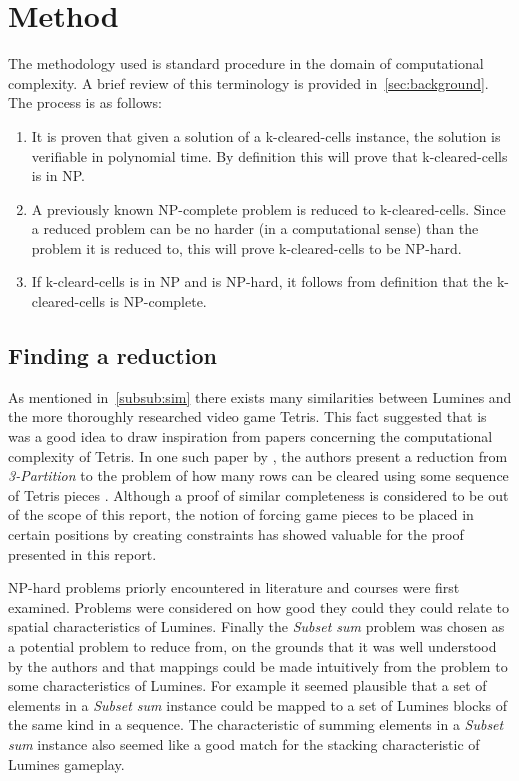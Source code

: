 \section{Method}
\label{method}

The methodology used is standard procedure in the domain of computational complexity. A brief review of this terminology is provided in~\ref{sec:background}.
The process is as follows:

\begin{enumerate}
\item It is proven that given a solution of a k-cleared-cells instance, the solution is verifiable in polynomial time. By definition this will prove that k-cleared-cells is in NP.
\item A previously known NP-complete problem is reduced to k-cleared-cells. Since a reduced problem can be no harder (in a computational sense) than the problem it is reduced to, this will prove k-cleared-cells to be NP-hard.
\item If k-cleard-cells is in NP and is NP-hard, it follows from definition that the k-cleared-cells is NP-complete.
\end{enumerate}

\subsection{Finding a reduction}
As mentioned in~\ref{subsub:sim} there exists many similarities between Lumines and the more thoroughly researched video game Tetris. This fact suggested that is was a good idea to draw inspiration from papers concerning the computational complexity of Tetris. In one such paper by \citeauthor{tetris}, the authors present a reduction from \textit{3-Partition} to the problem of how many rows can be cleared using some sequence of Tetris pieces \cite{tetris}. Although a proof of similar completeness is considered to be out of the scope of this report, the notion of forcing game pieces to be placed in certain positions by creating constraints has showed valuable for the proof presented in this report.

NP-hard problems priorly encountered in literature and courses were first examined. Problems were considered on how good they could they could relate to spatial characteristics of Lumines. Finally the \textit{Subset sum} problem was chosen as a potential problem to reduce from, on the grounds that it was well understood by the authors and that mappings could be made intuitively from the problem to some characteristics of Lumines. For example it seemed plausible that a set of elements in a \textit{Subset sum} instance could be mapped to a set of Lumines blocks of the same kind in a sequence. The characteristic of summing elements in a \textit{Subset sum} instance also seemed like a good match for the stacking characteristic of Lumines gameplay.

